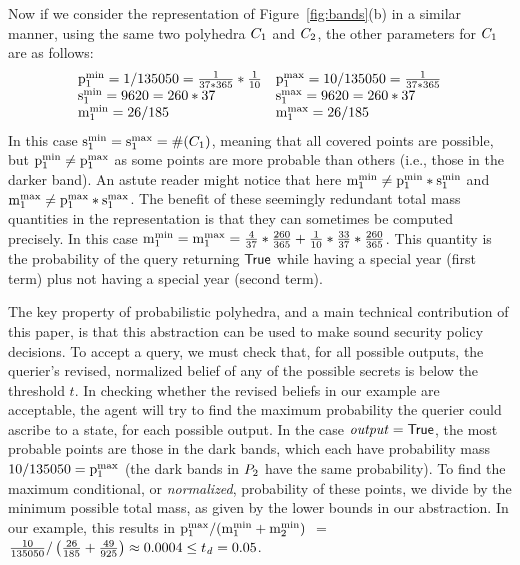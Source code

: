 

Now if we consider the representation of Figure~\ref{fig:bands}(b) in a
similar manner, using the same two polyhedra $C_{1}$ and
$C_{2}$, the other parameters for $C_{1}$ are as follows:
\begin{equation} \label{eq-nonuniform}
\begin{array}{ll}
\mathrm{p}^\mathrm{min}_{1} = 1/135050 = \frac{1}{37*365}*\frac{1}{10} & \mathrm{p}^\mathrm{max}_{1} =
10/135050 = \frac{1}{37*365} \\
\mathrm{s}^\mathrm{min}_{1} = 9620 = 260 * 37 & \mathrm{s}^\mathrm{max}_{1} = 9620 =260 * 37 \\
\mathrm{m}^\mathrm{min}_{1} = 26/185 & \mathrm{m}^\mathrm{max}_{1} = 26/185 \\
\end{array}
\end{equation}
In this case $\mathrm{s}^\mathrm{min}_{1} = \mathrm{s}^\mathrm{max}_{1} = \#(C_{1})$, meaning
that all covered points are possible, but $\mathrm{p}^\mathrm{min}_{1} \not= \mathrm{p}^\mathrm{max}_{1}$ as
some points are more probable than others (i.e., those in the darker
band). An astute reader might notice that here $ \mathrm{m}^\mathrm{min}_{1} \neq
\mathrm{p}^\mathrm{min}_{1} * \mathrm{s}^\mathrm{min}_{1} $ and $ \mathrm{m}^\mathrm{max}_{1} \neq \mathrm{p}^\mathrm{max}_{1} * \mathrm{s}^\mathrm{max}_{1} $. The
benefit of these seemingly redundant total mass quantities in the
representation is that they can sometimes be computed precisely. In
this case $ \mathrm{m}^\mathrm{min}_{1} = \mathrm{m}^\mathrm{max}_{1} = \frac{4}{37}*\frac{260}{365} +
\frac{1}{10}*\frac{33}{37}*\frac{260}{365} $. This quantity is the
probability of the query returning $ \mathsf{True} $ while having a special
year (first term) plus not having a special year (second
term).

The key property of probabilistic polyhedra, and a main technical
contribution of this paper, is that this abstraction can be used to make
sound security policy decisions.  To accept a query, we must check that, for
all possible outputs, the querier's revised, normalized belief of any of the
possible secrets is below the threshold $t$.  In checking whether the
revised beliefs in our example are acceptable, the agent will try to find
the maximum probability the querier could ascribe to a state, for each
possible output.  In the case $\mathit{output} = \mathsf{True}$, the most probable
points are those in the dark bands, which each have probability mass
$10/135050 = \mathrm{p}^\mathrm{max}_{1}$ (the dark bands in $P_{2}$ have the same
probability).
To find the maximum conditional, or \emph{normalized}, probability of
these points, we divide by the minimum possible total mass, as given
by the lower bounds in our abstraction.  In our example, this results
in $\mathrm{p}^\mathrm{max}_{1} / (\mathrm{m}^\mathrm{min}_{1} + \mathrm{m}^\mathrm{min}_{2})$ $=$ $\frac{10}{135050} / \left( \frac{26}{185} +
\frac{49}{925} \right) \approx 0.0004 \leq t_{\mathit{d}} = 0.05$.

